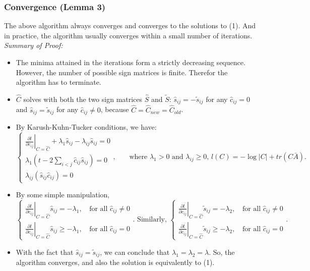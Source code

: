 \documentclass[11pt]{article} %
\begin{document}
\subsubsection{Convergence (Lemma 3)}
The above algorithm always converges and converges to the solutions to (1). And in practice, the algorithm usually converges within a small number of iterations. \\
\emph{Summary of Proof: }
\begin{itemize}
\item The minima attained in the iterations form a strictly decreasing sequence. However, the number of possible sign matrices is finite. Therefor the algorithm has to terminate. 
\item $\hat{C}$ solves with both the two sign matrices $\hat{S}$ and $\tilde{S}$: $\hat{s}_{ij}=-\tilde{s}_{ij}$ for any $\hat{c}_{ij}=0$ and $\hat{s}_{ij}=\tilde{s}_{ij}$ for any $\hat{c}_{ij}\neq 0$, because $\hat{C}=\hat{C}_{new}=\hat{C}_{old}$.
\item By Karush-Kuhn-Tucker conditions, we have: \[\left\lbrace
\begin{array}{l}
\left.\frac{\partial l}{\partial c_{ij}}\right\vert_{C=\hat{C}}+\lambda_1 \hat{s}_{ij}-\lambda_{ij}\hat{s}_{ij}=0\\
\lambda_1\left(t-2\sum_{i<j}\hat{c}_{ij}\hat{s}_{ij}\right)=0\\
\lambda_{ij}\left(\hat{s}_{ij}\hat{c}_{ij}\right)=0
\end{array}\right.
\mbox{,}\qquad \mbox{where }\lambda_1>0\mbox{ and }\lambda_{ij}\geq 0\mbox{, }l(C)=-\log|C|+tr(C\bar{A})\mbox{.}\]
\item By some simple manipulation, \[\left\lbrace
\begin{array}{ll}
\left. \frac{\partial l}{\partial c_{ij}}\right\vert_{C=\hat{C}}\hat{s}_{ij}=-\lambda_1\mbox{, } & \mbox{for all }\hat{c}_{ij}\neq 0\\
 \left. \frac{\partial l}{\partial c_{ij}}\right\vert_{C=\hat{C}}\hat{s}_{ij}\geq -\lambda_1\mbox{, } & \mbox{for all }\hat{c}_{ij}= 0
\end{array}\right.
\mbox{. Similarly, }\left\lbrace
\begin{array}{ll}
\left. \frac{\partial l}{\partial c_{ij}}\right\vert_{C=\hat{C}}\tilde{s}_{ij}=-\lambda_2\mbox{, } & \mbox{for all }\hat{c}_{ij}\neq 0\\
 \left. \frac{\partial l}{\partial c_{ij}}\right\vert_{C=\hat{C}}\tilde{s}_{ij}\geq -\lambda_2\mbox{, } & \mbox{for all }\hat{c}_{ij}= 0
\end{array}\right.\mbox{.}
\]
\item With the fact that $\hat{s}_{ij}=\tilde{s}_{ij}$, we can conclude that $\lambda_1=\lambda_2=\lambda$. So, the algorithm converges, and also the solution is equivalently to (1). 
\end{itemize}
\end{document}
